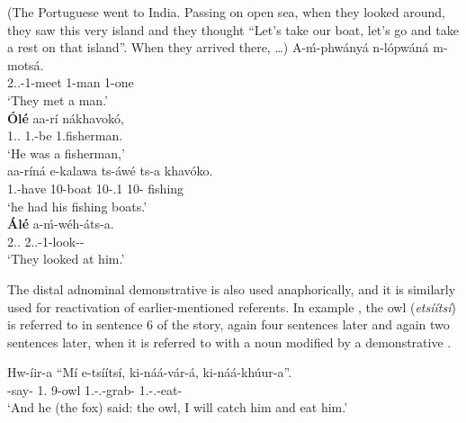 \documentclass[output=paper]{langscibook}
\begin{document}
\ea
\label{bkm:Ref96938313}(The Portuguese went to India. Passing on open sea, when they looked around, they saw this very island and they thought “Let’s take our boat, let’s go and take a rest on that island”. When they arrived there, …)
\ea
\label{bkm:Ref96938313:a}
\gll
A-ḿ-phwányá  n-lópwáná  m-motsá.\\
2\SM{}.\PFV{}.\DJ{}-1\OM{}-meet  1-man  1-one\\
\glt
‘They met a man.’\\



\ex
\label{bkm:Ref96938313:b}
\gll
\textbf{Ólé}  aa-rí  nákhavokó,\\
1.\DEM{}.\DIST{}  1\SM{}.\PST{}-be  1.fisherman.\PRL{}\\
\glt
    ‘He was a fisherman,’\\


\ex
\label{bkm:Ref96938313:c}
\gll
aa-ríná  e-kalawa  ts-áwé  ts-a  khavóko.\\
1\SM{}.\PST{}-have  10-boat  10-\POSS{}.1  10-\CONN{}  fishing\\
\glt
    ‘he had his fishing boats.’\\


\ex
\label{bkm:Ref96938313:d}
\gll
\textbf{Álé}  a-ḿ-wéh-áts-a.\\
2.\DEM{}.\DIST{}  2\SM{}.\PFV{}.\DJ{}-1\OM{}-look-\PLUR{}-\FV{}\\
\glt
    ‘They looked at him.’  \citep[197]{vanderWal2010}\\

\z
\z

The distal adnominal demonstrative is also used anaphorically, and it is similarly used for reactivation of earlier-mentioned referents. In example , the owl (\textit{etsíítsí}) is referred to in sentence 6 of the story, again four sentences later and again two sentences later, when it is referred to with a noun modified by a demonstrative \citep[93]{vanderWal2010}.

\ea
\label{bkm:Ref96939989}
\gll
Hw-íir-a  “Mí  e-tsíítsí,  ki-náá-vár-á,  ki-náá-khúur-a”.\\
\NARR{}-say-\FV{}  1\SG{}.\PRO{}  9-owl  1\SG{}.\SM{}-\PRS{}.\DJ{}-grab-\FV{}  1\SG{}.\SM{}-\PRS{}.\DJ{}-eat-\FV{}\\
\glt
‘And he (the fox) said: the owl, I will catch him and eat him.’\\
\end{document}

